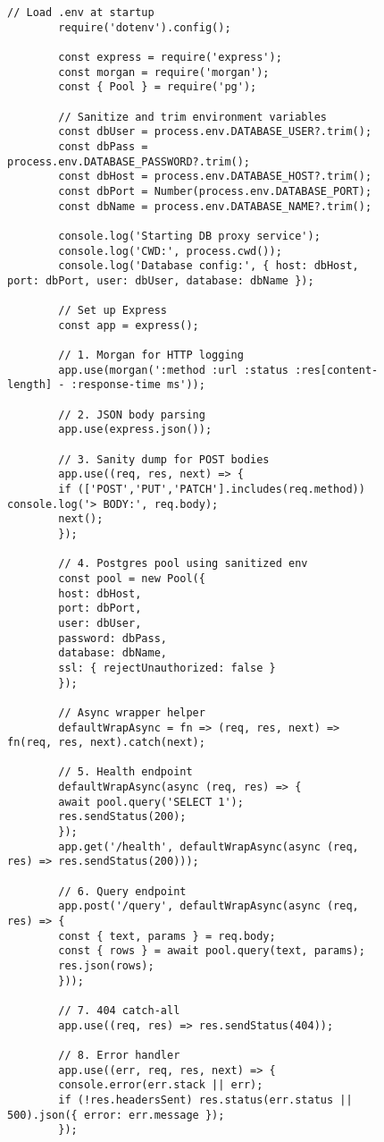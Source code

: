 \begin{figure}[bht]
    \begin{lstlisting}[caption=EC2-Proxy in NodeJS, label=list:proxy]
        // Load .env at startup
		require('dotenv').config();

		const express = require('express');
		const morgan = require('morgan');
		const { Pool } = require('pg');

		// Sanitize and trim environment variables
		const dbUser = process.env.DATABASE_USER?.trim();
		const dbPass = process.env.DATABASE_PASSWORD?.trim();
		const dbHost = process.env.DATABASE_HOST?.trim();
		const dbPort = Number(process.env.DATABASE_PORT);
		const dbName = process.env.DATABASE_NAME?.trim();

		console.log('Starting DB proxy service');
		console.log('CWD:', process.cwd());
		console.log('Database config:', { host: dbHost, port: dbPort, user: dbUser, database: dbName });

		// Set up Express
		const app = express();

		// 1. Morgan for HTTP logging
		app.use(morgan(':method :url :status :res[content-length] - :response-time ms'));

		// 2. JSON body parsing
		app.use(express.json());

		// 3. Sanity dump for POST bodies
		app.use((req, res, next) => {
		if (['POST','PUT','PATCH'].includes(req.method)) console.log('> BODY:', req.body);
		next();
		});

		// 4. Postgres pool using sanitized env
		const pool = new Pool({
		host: dbHost,
		port: dbPort,
		user: dbUser,
		password: dbPass,
		database: dbName, 
		ssl: { rejectUnauthorized: false }
		});

		// Async wrapper helper
		defaultWrapAsync = fn => (req, res, next) => fn(req, res, next).catch(next);

		// 5. Health endpoint
		defaultWrapAsync(async (req, res) => {
		await pool.query('SELECT 1');
		res.sendStatus(200);
		});
		app.get('/health', defaultWrapAsync(async (req, res) => res.sendStatus(200)));

		// 6. Query endpoint
		app.post('/query', defaultWrapAsync(async (req, res) => {
		const { text, params } = req.body;
		const { rows } = await pool.query(text, params);
		res.json(rows);
		}));

		// 7. 404 catch-all
		app.use((req, res) => res.sendStatus(404));

		// 8. Error handler
		app.use((err, req, res, next) => {
		console.error(err.stack || err);
		if (!res.headersSent) res.status(err.status || 500).json({ error: err.message });
		});


\end{lstlisting}
\end{figure}
